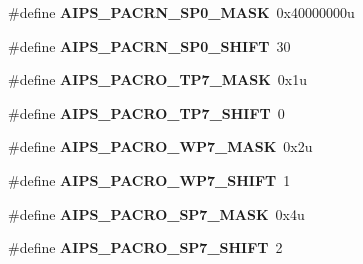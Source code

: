 \begin{DoxyCompactItemize}
\item 
\hypertarget{group___a_i_p_s___register___masks_ga76f688ae6b2df7fdaaa93fc06eed26b6}{}\#define {\bfseries A\+I\+P\+S\+\_\+\+P\+A\+C\+R\+N\+\_\+\+S\+P0\+\_\+\+M\+A\+S\+K}~0x40000000u\label{group___a_i_p_s___register___masks_ga76f688ae6b2df7fdaaa93fc06eed26b6}

\item 
\hypertarget{group___a_i_p_s___register___masks_gaf2360431fcaf89041736329326fdc97a}{}\#define {\bfseries A\+I\+P\+S\+\_\+\+P\+A\+C\+R\+N\+\_\+\+S\+P0\+\_\+\+S\+H\+I\+F\+T}~30\label{group___a_i_p_s___register___masks_gaf2360431fcaf89041736329326fdc97a}

\item 
\hypertarget{group___a_i_p_s___register___masks_ga6ed27808ffde1c176ac8af849f0e77c2}{}\#define {\bfseries A\+I\+P\+S\+\_\+\+P\+A\+C\+R\+O\+\_\+\+T\+P7\+\_\+\+M\+A\+S\+K}~0x1u\label{group___a_i_p_s___register___masks_ga6ed27808ffde1c176ac8af849f0e77c2}

\item 
\hypertarget{group___a_i_p_s___register___masks_gafb00e6dfdae9ad5ff353e7c124b4368f}{}\#define {\bfseries A\+I\+P\+S\+\_\+\+P\+A\+C\+R\+O\+\_\+\+T\+P7\+\_\+\+S\+H\+I\+F\+T}~0\label{group___a_i_p_s___register___masks_gafb00e6dfdae9ad5ff353e7c124b4368f}

\item 
\hypertarget{group___a_i_p_s___register___masks_gad48f775abbe6de940785427239a3af79}{}\#define {\bfseries A\+I\+P\+S\+\_\+\+P\+A\+C\+R\+O\+\_\+\+W\+P7\+\_\+\+M\+A\+S\+K}~0x2u\label{group___a_i_p_s___register___masks_gad48f775abbe6de940785427239a3af79}

\item 
\hypertarget{group___a_i_p_s___register___masks_gad1562f6be1339b36db265b158b849511}{}\#define {\bfseries A\+I\+P\+S\+\_\+\+P\+A\+C\+R\+O\+\_\+\+W\+P7\+\_\+\+S\+H\+I\+F\+T}~1\label{group___a_i_p_s___register___masks_gad1562f6be1339b36db265b158b849511}

\item 
\hypertarget{group___a_i_p_s___register___masks_gacda873f6c87c192f4ed85a919856649d}{}\#define {\bfseries A\+I\+P\+S\+\_\+\+P\+A\+C\+R\+O\+\_\+\+S\+P7\+\_\+\+M\+A\+S\+K}~0x4u\label{group___a_i_p_s___register___masks_gacda873f6c87c192f4ed85a919856649d}

\item 
\hypertarget{group___a_i_p_s___register___masks_gad3593cdd8cb81926913e6af6f816c401}{}\#define {\bfseries A\+I\+P\+S\+\_\+\+P\+A\+C\+R\+O\+\_\+\+S\+P7\+\_\+\+S\+H\+I\+F\+T}~2\label{group___a_i_p_s___register___masks_gad3593cdd8cb81926913e6af6f816c401}


\end{DoxyCompactItemize}
